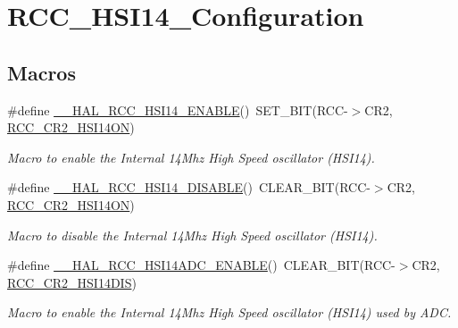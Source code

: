 \hypertarget{group___r_c_c___h_s_i14___configuration}{}\section{R\+C\+C\+\_\+\+H\+S\+I14\+\_\+\+Configuration}
\label{group___r_c_c___h_s_i14___configuration}
\subsection*{Macros}
\begin{DoxyCompactItemize}
\item 
\#define \hyperlink{group___r_c_c___h_s_i14___configuration_gae918e3236290b9f03f6bd7dc192dceae}{\+\_\+\+\_\+\+H\+A\+L\+\_\+\+R\+C\+C\+\_\+\+H\+S\+I14\+\_\+\+E\+N\+A\+B\+LE}()~S\+E\+T\+\_\+\+B\+IT(R\+CC-\/$>$C\+R2, \hyperlink{group___peripheral___registers___bits___definition_gaf600a82eec2d1445e91af6f98baf042e}{R\+C\+C\+\_\+\+C\+R2\+\_\+\+H\+S\+I14\+ON})
\begin{DoxyCompactList}\small\item\em Macro to enable the Internal 14\+Mhz High Speed oscillator (H\+S\+I14). \end{DoxyCompactList}\item 
\#define \hyperlink{group___r_c_c___h_s_i14___configuration_ga55588a95af70bea78b741ac53ecd4110}{\+\_\+\+\_\+\+H\+A\+L\+\_\+\+R\+C\+C\+\_\+\+H\+S\+I14\+\_\+\+D\+I\+S\+A\+B\+LE}()~C\+L\+E\+A\+R\+\_\+\+B\+IT(R\+CC-\/$>$C\+R2, \hyperlink{group___peripheral___registers___bits___definition_gaf600a82eec2d1445e91af6f98baf042e}{R\+C\+C\+\_\+\+C\+R2\+\_\+\+H\+S\+I14\+ON})
\begin{DoxyCompactList}\small\item\em Macro to disable the Internal 14\+Mhz High Speed oscillator (H\+S\+I14). \end{DoxyCompactList}\item 
\mbox{\label{group___r_c_c___h_s_i14___configuration_ga34755f0502ea1ee4d6a80abefc4156a4}} 
\#define \hyperlink{group___r_c_c___h_s_i14___configuration_ga34755f0502ea1ee4d6a80abefc4156a4}{\+\_\+\+\_\+\+H\+A\+L\+\_\+\+R\+C\+C\+\_\+\+H\+S\+I14\+A\+D\+C\+\_\+\+E\+N\+A\+B\+LE}()~C\+L\+E\+A\+R\+\_\+\+B\+IT(R\+CC-\/$>$C\+R2, \hyperlink{group___peripheral___registers___bits___definition_gaa9533da17718a4111cd8e1108b41d3a4}{R\+C\+C\+\_\+\+C\+R2\+\_\+\+H\+S\+I14\+D\+IS})
\begin{DoxyCompactList}\small\item\em Macro to enable the Internal 14\+Mhz High Speed oscillator (H\+S\+I14) used by A\+DC. \end{DoxyCompactList}\item 

\end{DoxyCompactItemize}
